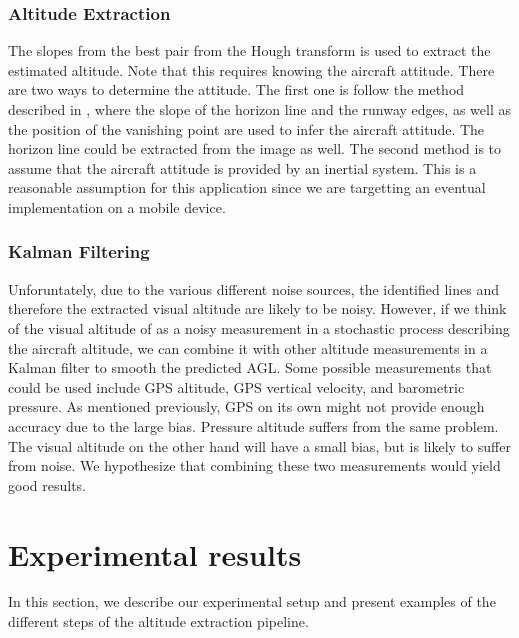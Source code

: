 \documentclass[letterpaper, conference]{IEEEtran}  %
\begin{document}
\subsubsection{\textbf{Altitude Extraction}}
The slopes from the best pair from the Hough transform is used to extract the estimated altitude. Note that this requires knowing the aircraft attitude. There are two ways to determine the attitude. The first one is follow the method described in \cite{Sasa2000}, where the slope of the horizon line and the runway edges, as well as the position of the vanishing point are used to infer the aircraft attitude. The horizon line could be extracted from the image as well. The second method is to assume that the aircraft attitude is provided by an inertial system. This is a reasonable assumption for this application since we are targetting an eventual implementation on a mobile device. 

\subsubsection{\textbf{Kalman Filtering}}
\label{sec:pipeline:kalman}
Unforuntately, due to the various different noise sources, the identified lines and therefore the extracted visual altitude are likely to be noisy. However, if we think of the visual altitude of as a noisy measurement in a stochastic process describing the aircraft altitude, we can combine it with other altitude measurements in a Kalman filter to smooth the predicted AGL. Some possible measurements that could be used include GPS altitude, GPS vertical velocity, and barometric pressure.
As mentioned previously, GPS on its own might not provide enough accuracy due to the large bias. Pressure altitude suffers from the same problem. The visual altitude on the other hand will have a small bias, but is likely to suffer from noise. We hypothesize that combining these two measurements would yield good results.


\section{Experimental results}
In this section, we describe our experimental setup and present examples of the different steps of the altitude extraction pipeline.
\end{document}
